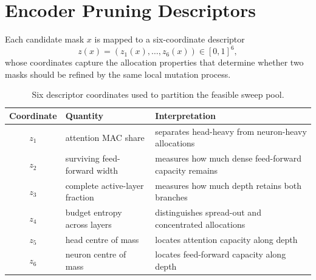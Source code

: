 %

\section*{Encoder Pruning Descriptors}

Each candidate mask $x$ is mapped to a six-coordinate descriptor
\[
z(x)=(z_1(x),\ldots,z_6(x))\in[0,1]^6 ,
\]
whose coordinates capture the allocation properties that determine whether
two masks should be refined by the same local mutation process.

\begin{table}[H]
\centering
\footnotesize
\setlength{\tabcolsep}{4pt}
\begin{tabularx}{0.92\textwidth}{c l X}
\toprule
Coordinate & Quantity & Interpretation \\
\midrule
$z_1$ & attention MAC share & separates head-heavy from neuron-heavy allocations \\
$z_2$ & surviving feed-forward width & measures how much dense feed-forward capacity remains \\
$z_3$ & complete active-layer fraction & measures how much depth retains both branches \\
$z_4$ & budget entropy across layers & distinguishes spread-out and concentrated allocations \\
$z_5$ & head centre of mass & locates attention capacity along depth \\
$z_6$ & neuron centre of mass & locates feed-forward capacity along depth \\
\bottomrule
\end{tabularx}
\caption{Six descriptor coordinates used to partition the feasible sweep pool.}
\label{tab:cvt_descriptor}
\end{table}

